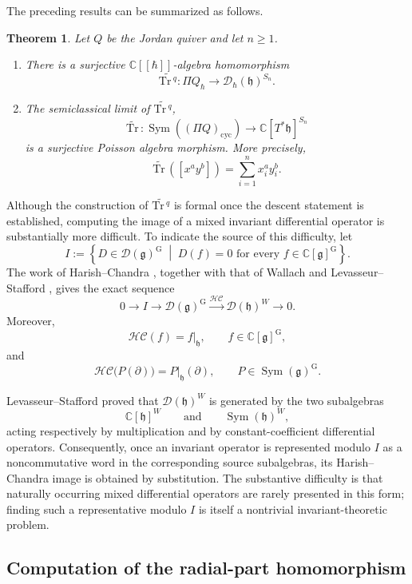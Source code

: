 \documentclass[11pt,reqno]{amsart}
\newtheorem{theorem}{Theorem}[section]
\theoremstyle{definition}
\newcommand{\bbC}{\mathbb{C}}
\newcommand{\rmG}{\mathrm{G}}
\newcommand{\Tr}{\mathrm{Tr} \,}
\newcommand{\mD}{\mathcal{D}}
\newcommand{\fkg}{\mathfrak{g}}
\newcommand{\cyc}{\mathrm{cyc}}
\newcommand{\Sym}{\operatorname{Sym}}
\newcommand{\fkh}{\mathfrak{h}}
\newcommand{\hc}{\mathcal{HC}}
\begin{document}
The preceding results can be summarized as follows.

\begin{theorem} \label{thm:intro-radial-qtrace}
Let \(Q\) be the Jordan quiver and let \(n\geq1\).
\begin{enumerate}
\item[$(1)$] There is a surjective \(\bbC[[\hbar]]\)-algebra homomorphism
\[
\widetilde{\Tr^q}:
\Pi Q_{\hbar}
\longrightarrow
\mD_\hbar(\fkh)^{S_n}.
\]

\item[$(2)$] The semiclassical limit of \(\widetilde{\Tr^q}\),
\[
\widetilde{\Tr}:
\Sym((\Pi Q)_\cyc)
\longrightarrow
\bbC[T^*\fkh]^{S_n}
\]
is a surjective {Poisson} algebra morphism.  More precisely,
\[
\widetilde{\Tr}([x^ay^b])
=
\sum_{i=1}^n x_i^ay_i^b.
\]
\end{enumerate}
\end{theorem}

Although the construction of \(\widetilde{\Tr^q}\) is formal once the descent statement is established, computing the image of a mixed invariant differential operator is substantially more difficult.  To indicate the source of this difficulty, let
\[
I
:=
\left\{
D\in \mD(\fkg)^{\rmG}
\;\middle|\;
D(f)=0
\text{ for every }
f\in \bbC[\fkg]^{\rmG}
\right\}.
\]
The work of Harish--Chandra \cite{HC1957Dif, HC1964Inv}, together with that of Wallach \cite{Wal1993Inv} and Levasseur--Stafford \cite{LevSta1995Inv,LevSta1996Ker}, gives the exact sequence
\[
0
\longrightarrow I
\longrightarrow \mD(\fkg)^{\rmG}
\xrightarrow{\hc}
\mD(\fkh)^{W}
\longrightarrow0.
\]
Moreover,
\[
\hc(f)=\left.f\right|_{\fkh},
\qquad
f\in\bbC[\fkg]^{\rmG},
\]
and
\[
\hc\bigl(P(\partial)\bigr)
=
\left.P\right|_{\fkh}(\partial),
\qquad
P\in\operatorname{Sym}(\fkg)^{\rmG}.
\]

Levasseur--Stafford \cite{LevSta1995Inv} proved that
\(\mD(\fkh)^{W}\) is generated by the two subalgebras
\[
\bbC[\fkh]^{W}
\qquad\text{and}\qquad
\operatorname{Sym}(\fkh)^{W},
\]
acting respectively by multiplication and by constant-coefficient differential operators.  Consequently, once an invariant operator is represented modulo \(I\) as a noncommutative word in the corresponding source subalgebras, its Harish--Chandra image is obtained by substitution.  The substantive difficulty is that naturally occurring mixed differential operators are rarely presented in this form; finding such a representative modulo \(I\) is itself a nontrivial invariant-theoretic problem.


\subsection{Computation of the radial-part homomorphism}
\label{subsec: state radial part in powersum}
\end{document}
